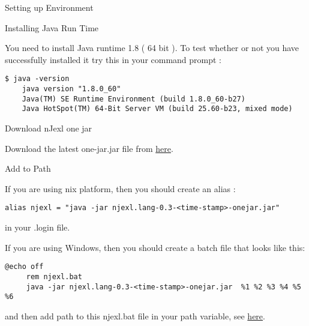\begin{section}{Setting up Environment}

\begin{subsection}{Installing Java Run Time}

 You need to install Java runtime 1.8 ( 64 bit ).
 To test whether or not you have successfully installed it try this 
 in your command prompt :

\begin{lstlisting}[style=all]
    $ java -version
    java version "1.8.0_60"
    Java(TM) SE Runtime Environment (build 1.8.0_60-b27)
    Java HotSpot(TM) 64-Bit Server VM (build 25.60-b23, mixed mode)
\end{lstlisting}

\end{subsection}

\begin{subsection}{Download nJexl one jar}

Download the latest one-jar.jar file from \href{https://oss.sonatype.org/content/repositories/snapshots/com/github/nmondal/njexl.lang/0.3-SNAPSHOT/}{here}.

\end{subsection}

\begin{subsection}{Add to Path}

If you are using \*nix platform, then you should create an alias :

\begin{lstlisting}[style=all]
     alias njexl = "java -jar njexl.lang-0.3-<time-stamp>-onejar.jar" 
\end{lstlisting}

in your .login file.

If you are using Windows, then you should create a batch file that looks like this:

\begin{lstlisting}[style=all]
     @echo off
     rem njexl.bat 
     java -jar njexl.lang-0.3-<time-stamp>-onejar.jar  %1 %2 %3 %4 %5 %6

\end{lstlisting}

and then add path to this njexl.bat file in your path variable, see 
\href{https://www.google.co.in/search?client=safari&rls=en&q=adding+path+in+windows&ie=UTF-8&oe=UTF-8&gfe_rd=cr&ei=EWpIVqjUJ-PI8AfWm4GgBQ}{here}.

\end{subsection}


\end{section}
